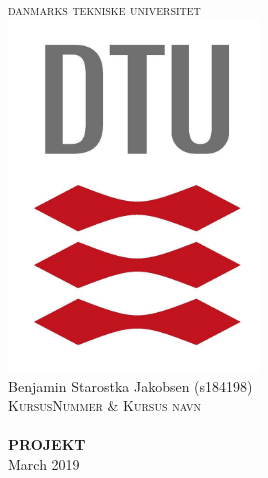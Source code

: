 \begin{titlepage}

    \centering 
    \textsc{\LARGE danmarks tekniske universitet}\\[10mm]
    \includegraphics[width=0.5\textwidth]{images/dtuLogo.jpg}\\[10mm]
    Benjamin Starostka Jakobsen (s184198)
    \HRule \\[0.4cm]
    \textsc{\large KursusNummer \& Kursus navn}\\[0.1 cm]
    \HRule \\[0.2cm]
    \textbf{PROJEKT}\\
    March 2019\\

\end{titlepage}
\newpage